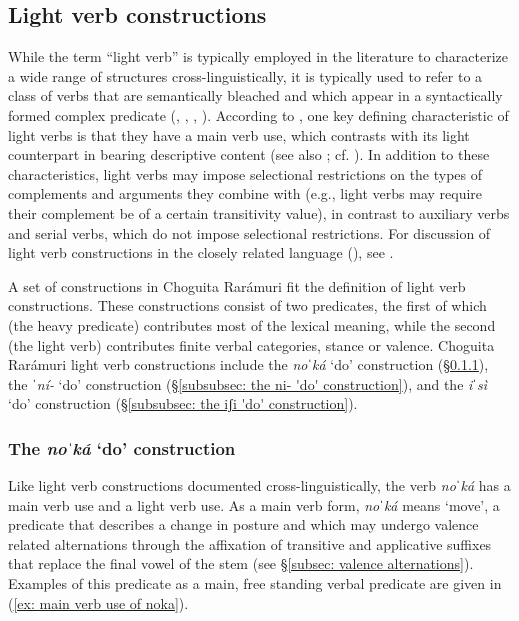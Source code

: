 \subsection{Light verb constructions}
\label{subsec: light verb and auxiliary constructions}

While the term ``light verb'' is typically employed in the literature to characterize a wide range of structures cross-linguistically, it is typically used to refer to a class of verbs that are semantically bleached and which appear in a syntactically formed complex predicate (\citealt{brugman2001light}, \citealt{brugman2001light}, \citealt{butt2001semi}, \citealt{bowern2004bardi}). According to \citet{butt1995structure}, one key defining characteristic of light verbs is that they have a main verb use, which contrasts with its light counterpart in bearing descriptive content (see also \citealt{svenonius2008complex}; cf. \citealt{tubino2014affixal}). In addition to these characteristics, light verbs may impose selectional restrictions on the types of complements and arguments they combine with (e.g., light verbs may require their complement be of a certain transitivity value), in contrast to auxiliary verbs and serial verbs, which do not impose selectional restrictions. For discussion of light verb constructions in the closely related  language (), see \citet{tubino2014affixal}.

A set of constructions in Choguita Rarámuri fit the definition of light verb constructions. These constructions consist of two predicates, the first of which (the heavy predicate) contributes most of the lexical meaning, while the second (the light verb) contributes finite verbal categories, stance or valence. Choguita Rarámuri light verb constructions include the \textit{noˈká} ‘do’ construction (§\ref{subsubsec: the noka 'do' construction}), the \textit{ˈní-} ‘do’ construction (§\ref{subsubsec: the ni- 'do' construction}), and the \textit{iˈsì} ‘do’ construction (§\ref{subsubsec: the iʃi 'do' construction}).

\subsubsection{The \textit{noˈká} ‘do’ construction}
\label{subsubsec: the noka 'do' construction}

Like light verb constructions documented cross-linguistically, the verb \textit{noˈká} has a main verb use and a light verb use. As a main verb form, \textit{noˈká} means ‘move’, a predicate that describes a change in posture and which may undergo valence related alternations through the affixation of transitive and applicative suffixes that replace the final vowel of the stem (see §\ref{subsec: valence alternations}). Examples of this predicate as a main, free standing verbal predicate are given in (\ref{ex: main verb use of noka}).

